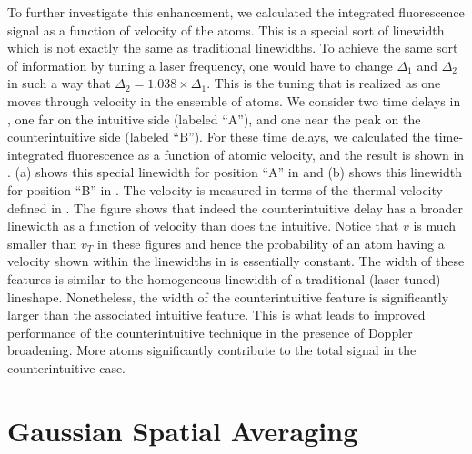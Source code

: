 To further investigate this enhancement, we calculated the integrated
fluorescence signal as a function of velocity of the atoms.  This is a special
sort of linewidth which is not exactly the same as traditional linewidths.  To
achieve the same sort of information by tuning a laser frequency, one would have
to change $\Delta_1$ and $\Delta_2$ in such a way that $\Delta_2 = 1.038 \times
\Delta_1$.  This is the tuning that is realized as one moves through 
velocity in the ensemble of atoms.  We consider two time delays in
, one far on the intuitive side (labeled ``A''),
and one near the peak on the counterintuitive side (labeled ``B'').  For
these time delays, we calculated the time-integrated fluorescence as a function
of atomic velocity, and the result is shown in
.  (a) shows this special linewidth for position ``A'' in
 and (b) shows this linewidth for position ``B'' in
.  The velocity is measured in terms of the thermal velocity
defined in .  The figure shows that indeed the counterintuitive
delay has a broader linewidth as a function of velocity than does the
intuitive.  Notice that $v$ is much smaller than $v_T$ in these figures and
hence the probability of an atom having a velocity shown within the linewidths
in  is essentially constant.  The width of these features is similar to
the homogeneous linewidth of a traditional (laser-tuned) lineshape. Nonetheless,
the width of the counterintuitive feature is significantly larger than the
associated intuitive feature.  This is what leads to improved performance of the
counterintuitive technique in the presence of Doppler broadening.  More atoms
significantly contribute to the total signal in the counterintuitive case.

\section{Gaussian Spatial Averaging}

